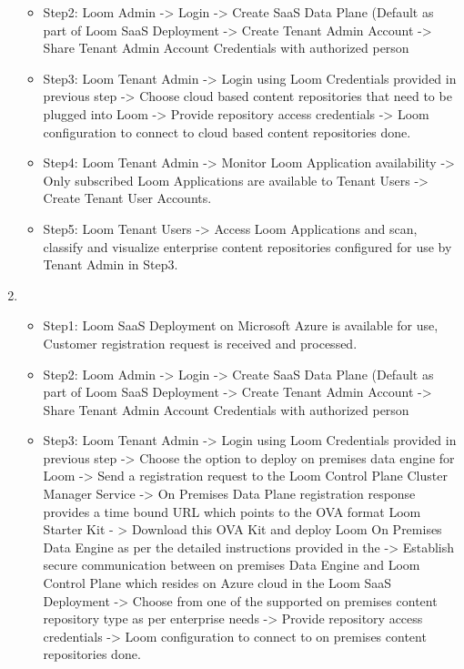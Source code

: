 \documentclass[letterpaper,10pt,english]{sphinxmanual}
\begin{document}
\begin{enumerate}
\begin{itemize}
\item {} 
Step2: Loom Admin -\textgreater{} Login -\textgreater{} Create SaaS Data Plane (Default as part of Loom SaaS Deployment  -\textgreater{} Create Tenant Admin Account -\textgreater{} Share Tenant Admin Account Credentials with authorized person

\item {} 
Step3: Loom Tenant Admin -\textgreater{} Login using Loom Credentials provided in previous step -\textgreater{} Choose cloud based content repositories that need to be plugged into Loom -\textgreater{} Provide repository access credentials -\textgreater{} Loom configuration to connect to cloud based content repositories done.

\item {} 
Step4: Loom Tenant Admin -\textgreater{} Monitor Loom Application availability -\textgreater{} Only subscribed Loom Applications are available to Tenant Users -\textgreater{} Create Tenant User Accounts.

\item {} 
Step5: Loom Tenant Users -\textgreater{} Access Loom Applications and scan, classify and visualize enterprise content repositories configured for use by Tenant Admin in Step3.

\end{itemize}

\item {} 
\begin{itemize}
\item {} 
Step1:  Loom SaaS Deployment on Microsoft Azure is available for use, Customer registration request is received and processed.

\item {} 
Step2: Loom Admin -\textgreater{} Login -\textgreater{} Create SaaS Data Plane (Default as part of Loom SaaS Deployment  -\textgreater{} Create Tenant Admin Account -\textgreater{} Share Tenant Admin Account Credentials with authorized person

\item {} 
Step3: Loom Tenant Admin -\textgreater{} Login using Loom Credentials provided in previous step -\textgreater{} Choose the option to deploy on premises data engine for Loom -\textgreater{} Send a registration request to the Loom Control Plane Cluster Manager Service -\textgreater{} On Premises Data Plane registration response provides a time bound URL which points to the OVA format Loom Starter Kit - \textgreater{} Download this OVA Kit and deploy Loom On Premises Data Engine as per the detailed instructions provided in the  -\textgreater{} Establish secure communication between on premises Data Engine and Loom Control Plane which resides on Azure cloud in the Loom SaaS Deployment -\textgreater{} Choose from one of the supported on premises content repository type as per enterprise needs -\textgreater{} Provide repository access credentials -\textgreater{} Loom configuration to connect to on premises content repositories done.


\end{itemize}
\end{enumerate}
\end{document}
